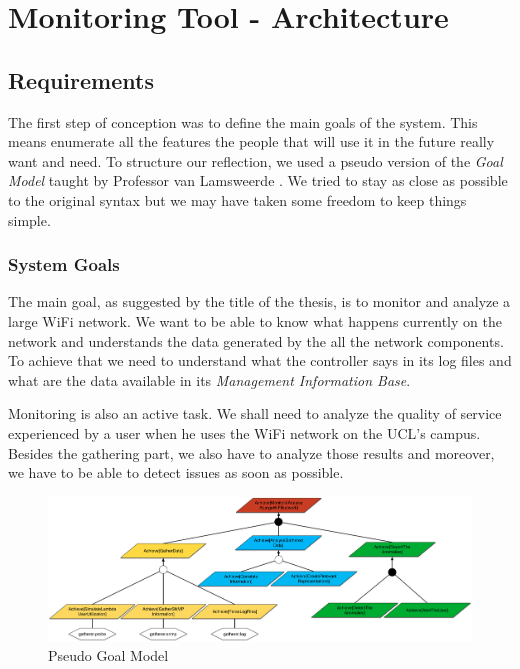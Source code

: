 
\chapter{Monitoring Tool - Architecture} %

\label{Chapter3} %

\section{Requirements}
The first step of conception was to define the main goals of the system. This means enumerate all the features the people that will use it in the future really want and need. To structure our reflection, we used a pseudo version of the \emph{Goal Model} taught by Professor van Lamsweerde \cite{van2009requirements}. We tried to stay as close as possible to the original syntax but we may have taken some freedom to keep things simple.

\subsection{System Goals}
The main goal, as suggested by the title of the thesis, is to monitor and analyze a large WiFi network. We want to be able to know what happens currently on the network and understands the data generated by the all the network components. To achieve that we need to understand what the controller says in its log files and what are the data available in its \emph{Management Information Base}. 

Monitoring is also an active task. We shall need to analyze the quality of service experienced by a user when he uses the WiFi network on the UCL's campus. Besides the gathering part, we also have to analyze those results and moreover, we have to be able to detect issues as soon as possible.

\begin{figure}[H]
\centering
	\includegraphics[width=1.1\linewidth]{Pictures/chapter3/goals2.png}
	\caption{Pseudo Goal Model}
\end{figure}

